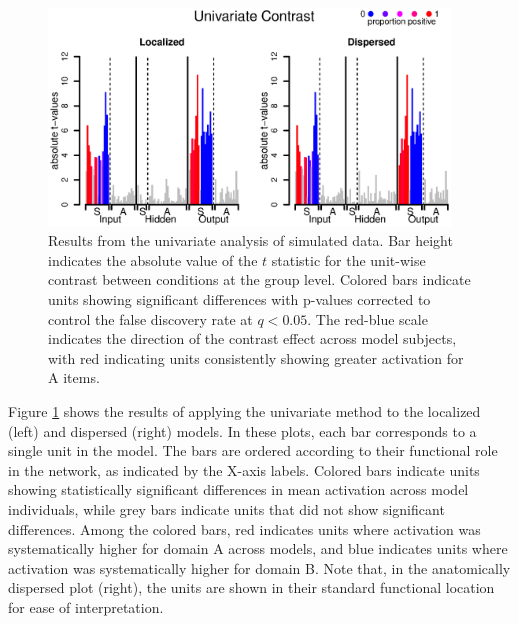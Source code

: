 \begin{figure}
\centering
\includegraphics[width=0.95\textwidth]{figures/figure4.eps}
\caption{Results from the univariate analysis of simulated data. Bar height indicates the absolute value of the $t$ statistic for the unit-wise contrast between conditions at the group level. Colored bars indicate units showing significant differences with p-values corrected to control the false discovery rate at $q<0.05$. The red-blue scale indicates the direction of the contrast effect across model subjects, with red indicating units consistently showing greater activation for A items.}
\label{fig.univariate} 
\end{figure}

Figure \ref{fig.univariate} shows the results of applying the univariate method to the localized (left) and dispersed (right) models. In these plots, each bar corresponds to a single unit in the model. The bars are ordered according to their functional role in the network, as indicated by the X-axis labels. Colored bars indicate units showing statistically significant differences in mean activation across model individuals, while grey bars indicate units that did not show significant differences. Among the colored bars, red indicates units where activation was systematically higher for domain A across models, and blue indicates units where activation was systematically higher for domain B. Note that, in the anatomically dispersed plot (right), the units are shown in their standard functional location for ease of interpretation.

